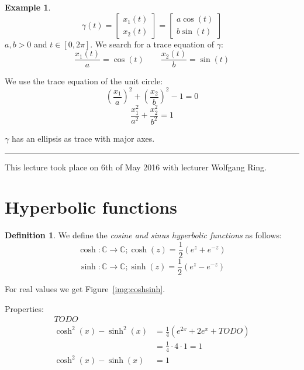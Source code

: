 \documentclass[a4paper,landscape,twocolumn]{article}
\theoremstyle{definition}
\newtheorem{defi}{Definition}
\newtheorem{ex}{Example}
\newcommand\meta[3]{\hrule{} This #1 took place on #2 with lecturer #3.\par}
\begin{document}
\begin{ex}
  \[
    \gamma(t)
    = \begin{bmatrix} x_1(t) \\ x_2(t) \end{bmatrix}
    = \begin{bmatrix} a\cos(t) \\ b\sin(t) \end{bmatrix}
  \]
  $a, b > 0$ and $t \in [0,2\pi]$.
  We search for a trace equation of $\gamma$:
  \[
    \frac{x_1(t)}{a} = \cos(t)
    \qquad
    \frac{x_2(t)}{b} = \sin(t)
  \]

  We use the trace equation of the unit circle:
  \[ \left(\frac{x_1}{a}\right)^2 + \left(\frac{x_2}{b}\right)^2 - 1 = 0 \]
  \[ \frac{x_1^2}{a^2} + \frac{x_2^2}{b^2} = 1 \]

  $\gamma$ has an ellipsis as trace with major axes.

\end{ex}

\meta{lecture}{6th of May 2016}{Wolfgang Ring}

\section{Hyperbolic functions}

\begin{defi}
  We define the \emph{cosine and sinus hyperbolic functions} as follows:
  \[ \cosh: \mathbb C \to \mathbb C; \cosh(z) = \frac12 \left(e^z + e^{-z}\right) \]
  \[ \sinh: \mathbb C \to \mathbb C; \sinh(z) = \frac12 \left(e^z - e^{-z}\right) \]

  For real values we get Figure~\ref{img:coshsinh}.

  Properties:
  \begin{align*}
    TODO & \\
    \cosh^2(x) - \sinh^2(x) &= \frac14 \left(e^{2x} + 2 e^x + TODO \right) \\
      &= \frac14 \cdot 4 \cdot 1 = 1 \\
    \cosh^2(x) - \sinh(x) &= 1
  \end{align*}
\end{defi}
\end{document}
